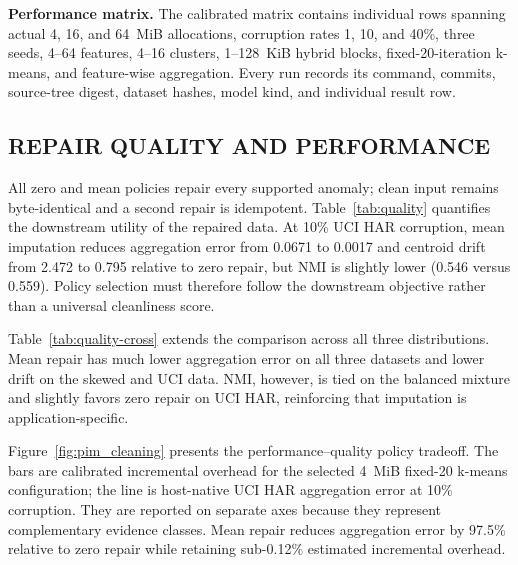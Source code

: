 \documentclass[conference]{IEEEtran}
\begin{document}
\textbf{Performance matrix.} The calibrated matrix contains
\PerformanceRowCount{} individual rows spanning actual 4, 16, and 64~MiB
allocations, corruption rates 1, 10, and 40\%, three seeds, 4--64 features,
4--16 clusters, 1--128~KiB hybrid blocks, fixed-20-iteration k-means, and
feature-wise aggregation. Every run records its command, commits, source-tree
digest, dataset hashes, model kind, and individual result row.

\begin{table}[t]
\caption{Calibrated performance matrix.}
\label{tab:matrix}
\centering\scriptsize

\end{table}

\subsection{REPAIR QUALITY AND PERFORMANCE}
All zero and mean policies repair every supported anomaly; clean input remains
byte-identical and a second repair is idempotent. Table~\ref{tab:quality}
quantifies the downstream utility of the repaired data.
At 10\% UCI HAR corruption, mean imputation reduces aggregation error from
0.0671 to 0.0017 and centroid drift from 2.472 to 0.795 relative to zero repair,
but NMI is slightly lower (0.546 versus 0.559). Policy selection must therefore
follow the downstream objective rather than a universal cleanliness score.

\begin{table}[t]
\caption{UCI HAR quality at 10\% corruption (five-seed means).}
\label{tab:quality}
\centering\scriptsize

\end{table}

Table~\ref{tab:quality-cross} extends the comparison across all three
distributions. Mean repair has much lower aggregation error on all three
datasets and lower drift on the skewed and UCI data. NMI, however, is tied on
the balanced mixture and slightly favors zero repair on UCI HAR, reinforcing
that imputation is application-specific.

\begin{table}[t]
\caption{Quality across datasets at 10\% corruption (five-seed means).}
\label{tab:quality-cross}
\centering\scriptsize

\end{table}

Figure~\ref{fig:pim_cleaning} presents the performance--quality policy
tradeoff. The bars are calibrated
incremental overhead for the selected 4~MiB fixed-20 k-means configuration; the
line is host-native UCI HAR aggregation error at 10\% corruption. They are
reported on separate axes because they represent complementary evidence
classes. Mean repair reduces aggregation error by 97.5\% relative to zero
repair while retaining sub-0.12\% estimated incremental overhead.
\end{document}
